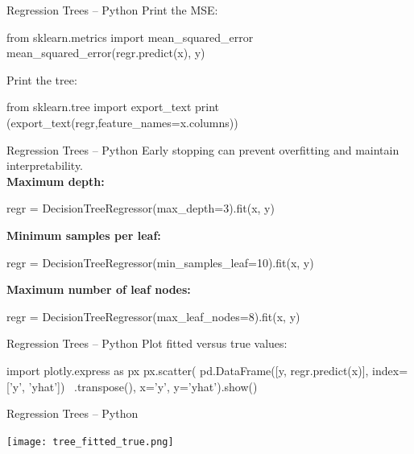 \documentclass[ignorenonframetext,xcolor=x11names]{beamer}
\begin{document}
\begin{frame}[fragile]{Regression Trees -- Python}
Print the MSE:
\begin{pythoncode}
from sklearn.metrics import mean_squared_error
mean_squared_error(regr.predict(x), y)
\end{pythoncode}
Print the tree:
\begin{pythoncode}
from sklearn.tree import export_text
print (export_text(regr,feature_names=x.columns))
\end{pythoncode}
\end{frame}

\begin{frame}[fragile]{Regression Trees -- Python}
Early stopping can prevent overfitting and maintain interpretability. \\

\vspace{\baselineskip}
\textbf{Maximum depth:}
\begin{pythoncode}
regr = DecisionTreeRegressor(max_depth=3).fit(x, y)
\end{pythoncode}

\textbf{Minimum samples per leaf:}
\begin{pythoncode}
regr = DecisionTreeRegressor(min_samples_leaf=10).fit(x, y)
\end{pythoncode}

\textbf{Maximum number of leaf nodes:}
\begin{pythoncode}
regr = DecisionTreeRegressor(max_leaf_nodes=8).fit(x, y)
\end{pythoncode}
\end{frame}


\begin{frame}[fragile]{Regression Trees -- Python}
Plot fitted versus true values:
\begin{pythoncode}
import plotly.express as px
px.scatter(
    pd.DataFrame([y, regr.predict(x)], index=['y', 'yhat']) \
    .transpose(),
    x='y', y='yhat').show()
\end{pythoncode}
\end{frame}

\begin{frame}{Regression Trees -- Python}

\centering

\texttt{[image: tree\_fitted\_true.png]}
\end{frame}
\end{document}
